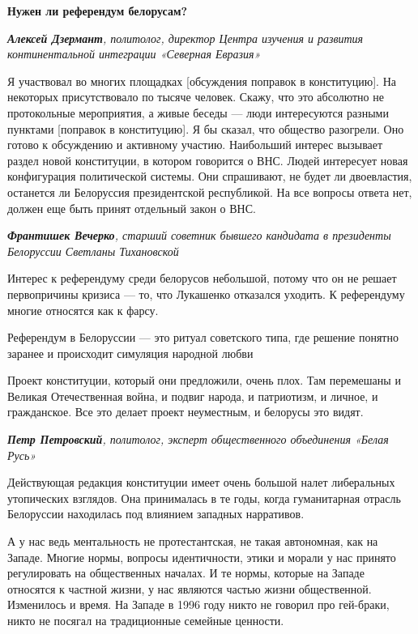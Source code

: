 \textbf{Нужен ли референдум белорусам?}

\textit{\textbf{Алексей Дзермант}, политолог, директор Центра изучения и развития континентальной интеграции «Северная Евразия»}

Я участвовал во многих площадках [обсуждения поправок в конституцию]. На некоторых присутствовало по тысяче человек. Скажу, что это абсолютно не протокольные мероприятия, а живые беседы — люди интересуются разными пунктами [поправок в конституцию]. Я бы сказал, что общество разогрели. Оно готово к обсуждению и активному участию. Наибольший интерес вызывает раздел новой конституции, в котором говорится о ВНС. Людей интересует новая конфигурация политической системы. Они спрашивают, не будет ли двоевластия, останется ли Белоруссия президентской республикой. На все вопросы ответа нет, должен еще быть принят отдельный закон о ВНС.

\textit{\textbf{Франтишек Вечерко}, старший советник бывшего кандидата в президенты Белоруссии Светланы Тихановской}

Интерес к референдуму среди белорусов небольшой, потому что он не решает первопричины кризиса — то, что Лукашенко отказался уходить. К референдуму многие относятся как к фарсу.

\begin{fancyquotes}
    Референдум в Белоруссии — это ритуал советского типа, где решение понятно заранее и происходит симуляция народной любви
\end{fancyquotes}

Проект конституции, который они предложили, очень плох. Там перемешаны и Великая Отечественная война, и подвиг народа, и патриотизм, и личное, и гражданское. Все это делает проект неуместным, и белорусы это видят.

\textit{\textbf{Петр Петровский}, политолог, эксперт общественного объединения «Белая Русь»}

Действующая редакция конституции имеет очень большой налет либеральных утопических взглядов. Она принималась в те годы, когда гуманитарная отрасль Белоруссии находилась под влиянием западных нарративов.

А у нас ведь ментальность не протестантская, не такая автономная, как на Западе. Многие нормы, вопросы идентичности, этики и морали у нас принято регулировать на общественных началах. И те нормы, которые на Западе относятся к частной жизни, у нас являются частью жизни общественной. Изменилось и время. На Западе в 1996 году никто не говорил про гей-браки, никто не посягал на традиционные семейные ценности.

